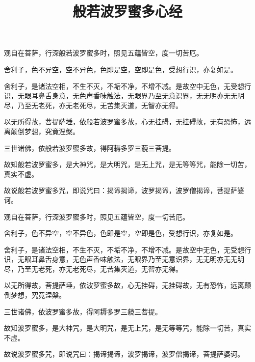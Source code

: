 \documentclass[a4paper,twoside]{article}
\title{般若波罗蜜多心经}
\author{}
\date{}
\begin{document}
\maketitle
\vspace{-5em}

\fontsize{14pt}{\baselineskip}\selectfont%

观自在菩萨，行深般若波罗蜜多时，照见五蕴皆空，度一切苦厄。


舍利子，色不异空，空不异色，色即是空，空即是色，受想行识，亦复如是。


舍利子，是诸法空相，不生不灭，不垢不净，不增不减。是故空中无色，无受想行识，无眼耳鼻舌身意，无色声香味触法，无眼界乃至无意识界，无无明亦无无明尽，乃至无老死，亦无老死尽，无苦集灭道，无智亦无得。


以无所得故，菩提萨埵，依般若波罗蜜多故，心无挂碍，无挂碍故，无有恐怖，远离颠倒梦想，究竟涅槃。


三世诸佛，依般若波罗蜜多故，得阿耨多罗三藐三菩提。


故知般若波罗蜜多，是大神咒，是大明咒，是无上咒，是无等等咒，能除一切苦，真实不虚。


故说般若波罗蜜多咒，即说咒曰：揭谛揭谛，波罗揭谛，波罗僧揭谛，菩提萨婆诃。
\clearpage
\vspace{5em}
\begin{pinyinscope}
观自在菩萨，行深波罗蜜多时，照见五蕴皆空，度一切苦厄。


舍利子，色不异空，空不异色，色即是空，空即是色，受想行识，亦复如是。


舍利子，是诸法空相，不生不灭，不垢不净，不增不减。是故空中无色，无受想行识，无眼耳鼻舌身意，无色声香味触法，无眼界乃至无意识界，无无明亦无无明尽，乃至无老死，亦无老死尽，无苦集灭道，无智亦无得。


以无所得故，菩提萨埵，依波罗蜜多故，心无挂碍，无挂碍故，无有恐怖，远离颠倒梦想，究竟涅槃。


三世诸佛，依波罗蜜多故，得阿耨多罗三藐三菩提。


故知波罗蜜多，是大神咒，是大明咒，是无上咒，是无等等咒，能除一切苦，真实不虚。


故说波罗蜜多咒，即说咒曰：揭谛揭谛，波罗揭谛，波罗僧揭谛，菩提萨婆诃。
\end{pinyinscope}
\end{document}
